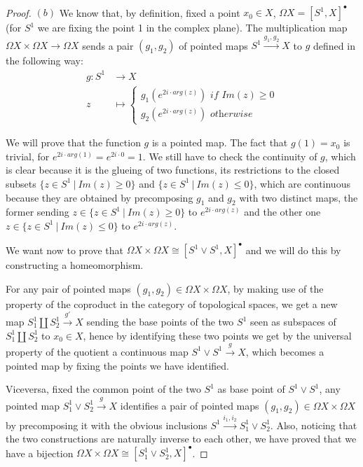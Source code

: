 \documentclass{article}
\begin{document}
~\\
\begin{proof}
	$(b)$ We know that, by definition, fixed a point $x_0\in X$, $\Omega X=[S^1,X]^{\bullet}$ (for $S^1$ we are fixing the point 1 in the complex plane). The multiplication map $\Omega X\times\Omega X\rightarrow\Omega X$ sends a pair $(g_1,g_2)$ of pointed maps $S^1\xrightarrow{g_1,g_2}X$ to $g$ defined in the following way:
	\begin{align*}
		g: S^1 &\rightarrow X \\
		z &\mapsto \begin{cases}
			g_1(e^{2i\cdot arg(z)})\textit{ if }Im(z)\geq 0 \\
			g_2(e^{2i\cdot arg(z)})\textit{ otherwise}
		\end{cases}			
	\end{align*}

	We will prove that the function $g$ is a pointed map. The fact that $g(1)=x_0$ is trivial, for $e^{2i\cdot arg(1)}=e^{2i\cdot 0}=1$. We still have to check the continuity of $g$, which is clear because it is the glueing of two functions, its restrictions to the closed subsets $\{z\in S^1\ |\ Im(z)\geq 0\}$ and $\{z\in S^1\ |\ Im(z)\leq 0\}$, which are continuous because they are obtained by precomposing $g_1$ and $g_2$ with two distinct maps, the former sending $z\in\{z\in S^1\ |\ Im(z)\geq 0\}$ to $e^{2i\cdot arg(z)}$ and the other one $z\in\{z\in S^1\ |\ Im(z)\leq 0\}$ to $e^{2i\cdot arg(z)}$.

	We want now to prove that $\Omega X\times\Omega X\cong [S^1\vee S^1,X]^{\bullet}$ and we will do this by constructing a homeomorphism.
	
	For any pair of pointed maps $(g_1,g_2)\in\Omega X\times\Omega X$, by making use of the property of the coproduct in the category of topological spaces, we get a new map $S^1_1\amalg S^1_2\xrightarrow{g'} X$ sending the base points of the two $S^1$ seen as subspaces of $S^1_1\amalg S^1_2$ to $x_0\in X$, hence by identifying these two points we get by the universal property of the quotient a continuous map $S^1\vee S^1\xrightarrow{g} X$, which becomes a pointed map by fixing the points we have identified.
	
	Viceversa, fixed the common point of the two $S^1$ as base point of $S^1\vee S^1$, any pointed map $S^1_1\vee S^1_2\xrightarrow{g} X$ identifies a pair of pointed maps $(g_1,g_2)\in\Omega X\times\Omega X$ by precomposing it with the obvious inclusions $S^1\xrightarrow{i_1,i_2}S^1_1\vee S^1_2$. Also, noticing that the two constructions are naturally inverse to each other, we have proved that we have a bijection $\Omega X\times\Omega X\cong [S^1_1\vee S^1_2,X]^{\bullet}$.
	

\end{proof}
\end{document}
